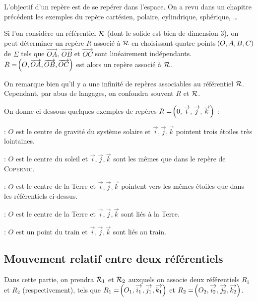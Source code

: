 \documentclass[a4paper,french,bookmarks]{book}
\begin{document}
    L'objectif d'un repère est de se repérer dans l'espace. On a revu dans un chapitre précédent les exemples du repère cartésien, polaire, cylindrique, sphérique, \dots\newline
    
    Si l'on considère un référentiel $\mathcal{R}$ (dont le solide est bien de dimension 3), on peut déterminer un repère $R$ associé à $\mathcal{R}$ en choisissant quatre points $\!\left(O, A, B, C\right)$ de $\Sigma$ tels que $\vec{OA}$, $\vec{OB}$ et $\vec{OC}$ sont linéairement indépendants. $R = \!\left(O, \overrightarrow{OA}, \overrightarrow{OB}, \overrightarrow{OC}\right)$ est alors un repère associé à $\mathcal{R}$.
    
    \begin{enumerate}
        \itt On remarque bien qu'il y a une infinité de repères associables au référentiel $\mathcal{R}$. Cependant, par abus de langages, on confondra souvent $R$ et $\mathcal{R}$.
    \end{enumerate}
    
    \begin{example}{}{}
        On donne ci-dessous quelques exemples de repères  $R = \!\left(0, \overrightarrow{i}, \overrightarrow{j}, \overrightarrow{k}\right)$ :
        \begin{enumerate}
            \itt {} : $O$ est le centre de gravité du système solaire et $\vec i, \vec j, \vec k$ pointent trois étoiles très lointaines.

            \itt {} : $O$ est le centre du soleil et $\vec i, \vec j, \vec k$ sont les mêmes que dans le repère de \textsc{Copernic}.
        
            \itt {} : $O$ est le centre de la Terre et $\vec i, \vec j, \vec k$ pointent vers les mêmes étoiles que dans les référentiels ci-dessus. 

            \itt {} : $O$ est le centre de la Terre et $\vec i, \vec j, \vec k$  sont liés à la Terre. 

            \itt {} : $O$ est un point du train et $\vec i, \vec j, \vec k$ sont liés au train.
        \end{enumerate}
    \end{example}
    
    \subsection{Mouvement relatif entre deux référentiels}
    
    Dans cette partie, on prendra $\mathcal{R}_1$ et $\mathcal{R}_2$ auxquels on associe deux référentiels $R_1$ et $R_2$ (respectivement), tels que $R_1 = \!\left(O_1, \overrightarrow{i_1}, \overrightarrow{j_1}, \overrightarrow{k_1}\right)$ et $R_2 = \!\left(O_2, \overrightarrow{i_2}, \overrightarrow{j_2}, \overrightarrow{k_2}\right)$.
    
\end{document}
